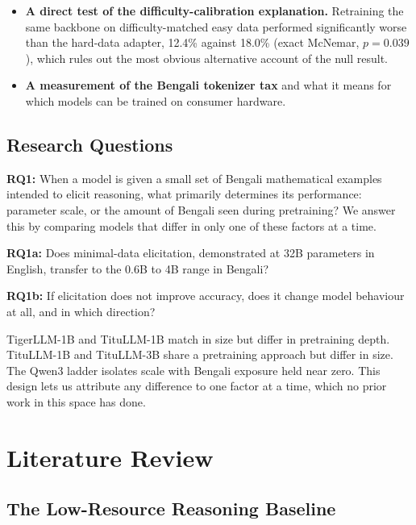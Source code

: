\begin{itemize}
        correctly before tuning, and Qwen3-4B abandoned its own answer format
        on 222 of 250 items while its accuracy moved by 13. Mean Bengali
        character adherence fell in six of seven models, by up to 17 points,
        and the per-item decline is significant in each of those six (exact
        sign test, $p < 10^{-7}$).
  \item \textbf{A direct test of the difficulty-calibration explanation.}
        Retraining the same backbone on difficulty-matched easy data performed
        significantly worse than the hard-data adapter, 12.4\% against 18.0\%
        (exact McNemar, $p = 0.039$), which rules out the most obvious
        alternative account of the null result.
  \item \textbf{A measurement of the Bengali tokenizer tax} and what it means
        for which models can be trained on consumer hardware.
\end{itemize}

\subsection{Research Questions}

\textbf{RQ1:} When a model is given a small set of Bengali mathematical examples
intended to elicit reasoning, what primarily determines its performance:
parameter scale, or the amount of Bengali seen during pretraining? We answer
this by comparing models that differ in only one of these factors at a time.

\textbf{RQ1a:} Does minimal-data elicitation, demonstrated at 32B parameters in
English, transfer to the 0.6B to 4B range in Bengali?

\textbf{RQ1b:} If elicitation does not improve accuracy, does it change model
behaviour at all, and in which direction?

TigerLLM-1B and TituLLM-1B match in size but differ in pretraining depth.
TituLLM-1B and TituLLM-3B share a pretraining approach but differ in size. The
Qwen3 ladder isolates scale with Bengali exposure held near zero. This design
lets us attribute any difference to one factor at a time, which no prior work in
this space has done.


\section{Literature Review}

\subsection{The Low-Resource Reasoning Baseline}

